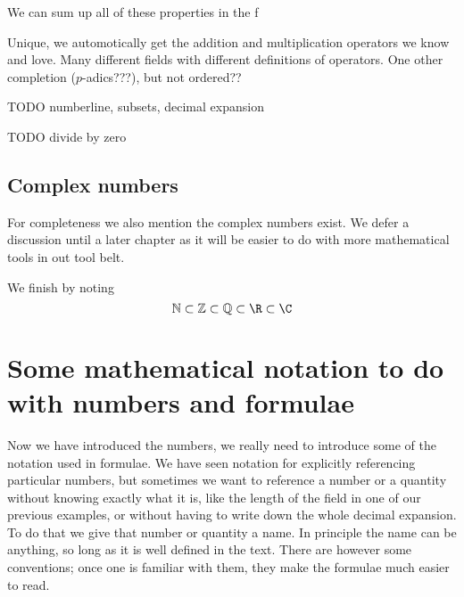 We can sum up all of these properties in the f

Unique, we automotically get the addition and multiplication operators we know and love. Many different fields with different definitions of operators. One other completion ($p$-adics???), but not ordered??

TODO numberline, subsets, decimal expansion

TODO divide by zero

\section{Complex numbers}
For completeness we also mention the complex numbers exist. We defer a discussion until a later chapter as it will be easier to do with more mathematical tools in out tool belt.

We finish by noting
\[ \mathbb{N} \subset \mathbb{Z} \subset \mathbb{Q} \subset \R \subset \C \]

\chapter{Some mathematical notation to do with numbers and formulae}
Now we have introduced the numbers, we really need to introduce some of the notation used in formulae. We have seen notation for explicitly referencing particular numbers, but sometimes we want to reference a number or a quantity without knowing exactly what it is, like the length of the field in one of our previous examples, or without having to write down the whole decimal expansion. To do that we give that number or quantity a name. In principle the name can be anything, so long as it is well defined in the text. There are however some conventions; once one is familiar with them, they make the formulae much easier to read.


